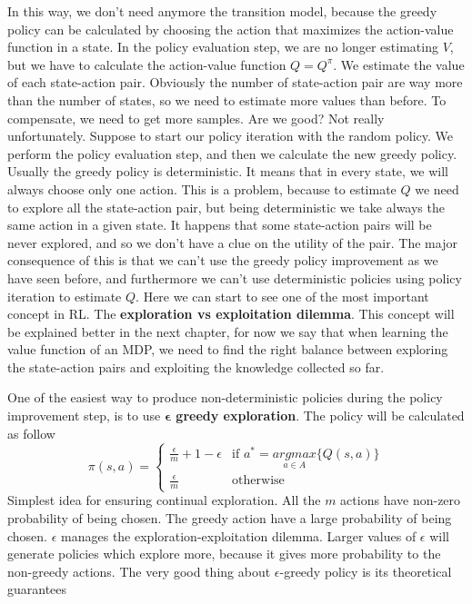\documentclass[main.tex]{subfiles}
\begin{document}
In this way, we don't need anymore the transition model, because the greedy policy can be calculated by choosing the action that maximizes the action-value function in a state. In the policy evaluation step, we are no longer estimating $V$, but we have to calculate the action-value function $Q = Q^{\pi}$. We estimate the value of each state-action pair. Obviously the number of state-action pair are way more than the number of states, so we need to estimate more values than before. To compensate, we need to get more samples. Are we good? Not really unfortunately. Suppose to start our policy iteration with the random policy. We perform the policy evaluation step, and then we calculate the new greedy policy. Usually the greedy policy is deterministic. It means that in every state, we will always choose only one action. This is a problem, because to estimate $Q$ we need to explore all the state-action pair, but being deterministic we take always the same action in a given state. It happens that some state-action pairs will be never explored, and so we don't have a clue on the utility of the pair. The major consequence of this is that we can't use the greedy policy improvement as we have seen before, and furthermore we can't use deterministic policies using policy iteration to estimate $Q$. Here we can start to see one of the most important concept in RL. The \textbf{exploration vs exploitation dilemma}. This concept will be explained better in the next chapter, for now we say that when learning the value function of an MDP, we need to find the right balance between exploring the state-action pairs and exploiting the knowledge collected so far.
\par
\noindent
One of the easiest way to produce non-deterministic policies during the policy improvement step, is to use \textbf{$\mathbf{\epsilon}$ greedy exploration}. The policy will be calculated as follow
\begin{equation}
    \pi(s,a) = 
    \begin{cases}
        \frac{\epsilon}{m}+1-\epsilon & \text{if }a^*=\underset{a \in A}{argmax} \{ Q(s,a) \} \\
        \frac{\epsilon}{m} & \text{otherwise}
    \end{cases}
\end{equation}
Simplest idea for ensuring continual exploration. All the $m$ actions have non-zero probability of being chosen. The greedy action have a large probability of being chosen. $\epsilon$ manages the exploration-exploitation dilemma. Larger values of $\epsilon$ will generate policies which explore more, because it gives more probability to the non-greedy actions. The very good thing about $\epsilon$-greedy policy is its theoretical guarantees
\end{document}
